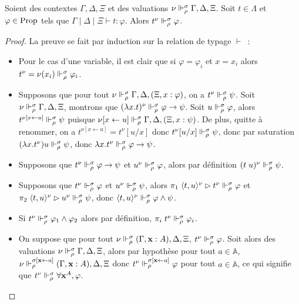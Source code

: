 \documentclass{article}
\begin{document}
\begin{lem}[Adéquation]
  Soient des contextes $\Gamma,\Delta,\Xi$ et des valuations $\nu\Vdash_\rho^\sigma \Gamma,\Delta,\Xi$. Soit $t\in\Lambda$ et $\varphi\in\mathrm{Prop}$ tels que $\Gamma\mid\Delta\mid\Xi\vdash t : \varphi$. Alors $t^\nu \Vdash_\rho^\sigma \varphi$.
\end{lem}

\begin{proof}
  La preuve se fait par induction sur la relation de typage $\vdash$~:
  \begin{itemize}
  \item Pour le cas d'une variable, il est clair que si $\varphi = \varphi_i$ et $x = x_i$ alors $t^\nu = \nu(x_i)\Vdash_\rho^\sigma \varphi_i$.
  \item Supposons que pour tout $\nu \Vdash_\rho^\sigma \Gamma,\Delta,(\Xi, x : \varphi)$, on a $t^\nu \Vdash_\rho^\sigma \psi$. Soit $\nu \Vdash_\rho^\sigma \Gamma,\Delta,\Xi$, montrons que $(\lambda x.t)^\nu\Vdash_\rho^\sigma \varphi \to \psi$. Soit $u \Vdash_\rho^\sigma \varphi$, alors $t^{\nu[x \leftarrow u]}\Vdash_\rho^\sigma \psi$ puisque $\nu[x\leftarrow u]\Vdash_\rho^\sigma \Gamma,\Delta,(\Xi, x : \psi)$. De plus, quitte à renommer, on a $t^{\nu[x\leftarrow u]} = t^\nu[u/x]$ donc $t^\nu[u/x]\Vdash_\rho^\sigma \psi$, donc par saturation $(\lambda x.t^\nu) u \Vdash_\rho^\sigma \psi$, donc $\lambda x.t^\nu\Vdash_\rho^\sigma \varphi\to\psi$.
  \item Supposons que $t^\nu\Vdash_\rho^\sigma \varphi \to \psi$ et $u^\nu\Vdash_\rho^\sigma \varphi$, alors par définition $(t\;u)^\nu\Vdash_\rho^\sigma \psi$.
  \item Supposons que $t^\nu\Vdash_\rho^\sigma \varphi$ et $u^\nu\Vdash_\rho^\sigma \psi$, alors $\pi_1\;\langle t,u\rangle^\nu \rhd t^\nu \Vdash_\rho^\sigma \varphi$ et $\pi_2\;\langle t,u\rangle^\nu\rhd u^\nu \Vdash_\rho^\sigma \psi$, donc $\langle t,u\rangle^\nu \Vdash_\rho^\sigma \varphi\land\psi$.
  \item Si $t^\nu \Vdash_\rho^\sigma \varphi_1\land\varphi_2$ alors par définition, $\pi_i\;t^\nu\Vdash_\rho^\sigma \varphi_i$.
  \item On suppose que pour tout $\nu\Vdash_\rho^\sigma (\Gamma, \mathbf{x} : A), \Delta,\Xi$, $t^\nu\Vdash_\rho^\sigma \varphi$. Soit alors des valuations $\nu\Vdash_\rho^\sigma \Gamma,\Delta,\Xi$, alors par hypothèse pour tout $a \in \mathbb A$, $\nu\Vdash_\rho^{\sigma[\mathbf{x}\leftarrow a]}(\Gamma, \mathbf{x} : A), \Delta, \Xi$ donc $t^\nu\Vdash_\rho^{\sigma[\mathbf{x} \leftarrow a]}\varphi$ pour tout $a\in \mathbb A$, ce qui signifie que $t^\nu \Vdash_\rho^\sigma \forall \mathbf{x}^A, \varphi$.

\end{itemize}
\end{proof}
\end{document}
